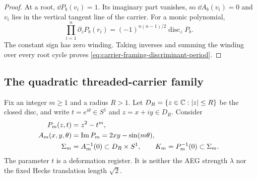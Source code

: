 \begin{proof}
At a root, $\dd P_b(v_i)=1$.  Its imaginary part vanishes, so
$\dd A_b(v_i)=0$ and $v_i$ lies in the vertical tangent line of the carrier.
For a monic polynomial,
\begin{equation}
 \prod_{i=1}^n\partial_zP_b(r_i)
 =(-1)^{n(n-1)/2}\operatorname{disc}_zP_b.
 \label{eq:derivative-product-discriminant}
\end{equation}
The constant sign has zero winding.  Taking inverses and summing the winding
over every root cycle proves \eqref{eq:carrier-framing-discriminant-period}.
\end{proof}

\subsection{The quadratic threaded-carrier family}

Fix an integer $m\ge1$ and a radius $R>1$.  Let
$D_R=\{z\in\mathbb{C}:|z|\le R\}$ be the closed disc, and write
$t=e^{i\theta}\in S^1$ and $z=x+iy\in D_R$.  Consider
\begin{align}
 P_m(z,t)&=z^2-t^m,
 \label{eq:quadratic-thread-polynomial}\\
 A_m(x,y,\theta)&=\operatorname{Im} P_m
                 =2xy-\sin(m\theta),
 \label{eq:quadratic-thread-assignment}\\
 \Sigma_m&=A_m^{-1}(0)\subset D_R\times S^1,
 \qquad
 K_m=P_m^{-1}(0)\subset\Sigma_m.
 \label{eq:quadratic-thread-carrier}
\end{align}
The parameter $t$ is a deformation register.  It is neither the AEG strength
$\lambda$ nor the fixed Hecke translation length $\sqrt2$.

